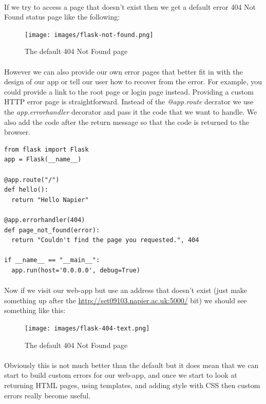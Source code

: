 \documentclass[12pt, a4paper, oneside]{book}
\begin{document}
\paragraph{} If we try to access a page that doesn't exist then we get a default error 404 Not Found status page like the following:

\begin{figure}[H]
\centering
\texttt{[image: images/flask-not-found.png]}
\caption{The default 404 Not Found page}
\label{fig:flask-not-found}
\end{figure}

\paragraph{} However we can also provide our own error pages that better fit in with the design of our app or tell our user how to recover from the error. For example, you could provide a link to the root page or login page instead. Providing a custom HTTP error page is straightforward. Instead of the \emph{@app.route} decrator we use the \emph{app.errorhandler} decorator and pass it the code that we want to handle. We also add the code after the return message so that the code is returned to the browser.

\begin{lstlisting}
from flask import Flask
app = Flask(__name__)

@app.route("/")
def hello():
  return "Hello Napier"

@app.errorhandler(404)
def page_not_found(error):
  return "Couldn't find the page you requested.", 404

if __name__ == "__main__":
  app.run(host='0.0.0.0', debug=True)
\end{lstlisting}

\paragraph{} Now if we visit our web-app but use an address that doesn't exist (just make something up after the \url{http://set09103.napier.ac.uk:5000/} bit) we should see something like this:

\begin{figure}[H]
\centering
\texttt{[image: images/flask-404-text.png]}
\caption{The default 404 Not Found page}
\label{fig:flask-404-text}
\end{figure}

\paragraph{} Obviously this is not much better than the default but it does mean that we can start to build custom errors for our web-app, and once we start to look at returning HTML pages, using templates, and adding style with CSS then custom errors really become useful.
\end{document}
